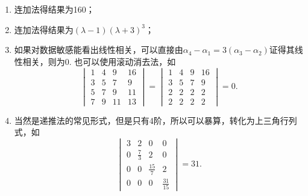 \documentclass[12pt,fontset=fandol]{ctexart}
\begin{document}
\begin{solve}
\begin{enumerate}
                \item 连加法得结果为160；

                \item 连加法得结果为$(\lambda-1)(\lambda+3)^3$；

                \item 如果对数据敏感能看出线性相关，可以直接由$\alpha_4-\alpha_1=3(\alpha_3-\alpha_2)$证得其线性相关，则为0. 也可以使用滚动消去法，如\[
                          \begin{vmatrix}
                              1 & 4 & 9  & 16 \\
                              3 & 5 & 7  & 9  \\
                              5 & 7 & 9  & 11 \\
                              7 & 9 & 11 & 13
                          \end{vmatrix}=\begin{vmatrix}
                              1 & 4 & 9 & 16 \\
                              3 & 5 & 7 & 9  \\
                              2 & 2 & 2 & 2  \\
                              2 & 2 & 2 & 2
                          \end{vmatrix}=0.\]

                \item 当然是递推法的常见形式，但是只有4阶，所以可以暴算，转化为上三角行列式，如\[
                          \begin{vmatrix}
                              3 & 2           & 0            & 0             \\
                              0 & \frac{7}{3} & 2            & 0             \\
                              0 & 0           & \frac{15}{7} & 2             \\
                              0 & 0           & 0            & \frac{31}{15}
                          \end{vmatrix}=31.\]
            \end{enumerate}
\end{solve}
\end{document}
